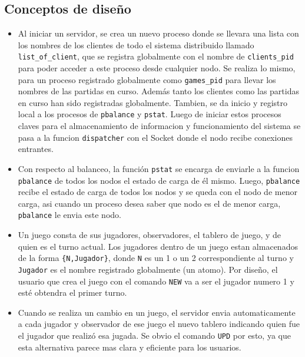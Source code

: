 \documentclass[a4paper]{article}
\newcommand{\blacktr}[0]{\item[$\blacktriangleright$]}
\begin{document}
\subsection*{Conceptos de diseño}
\begin{itemize}
  \blacktr Al iniciar un servidor, se crea un nuevo proceso donde se llevara una lista con los nombres de los clientes de todo el sistema distribuido llamado \texttt{list_of_client}, que se registra globalmente con el nombre de \texttt{clients_pid} para poder acceder a este proceso desde cualquier nodo. Se realiza lo mismo, para un proceso registrado globalmente como \texttt{games_pid} para llevar los nombres de las partidas en curso. Además tanto los clientes como las partidas en curso han sido registradas globalmente. Tambien, se da inicio y registro local a los procesos de \texttt{pbalance} y \texttt{pstat}. Luego de iniciar estos procesos claves para el almacenamiento de informacion y funcionamiento del sistema se pasa a la funcion \texttt{dispatcher} con el Socket donde el nodo recibe conexiones entrantes.
  \blacktr Con respecto al balanceo, la función \texttt{pstat} se encarga de enviarle a la funcion \texttt{pbalance} de todos los nodos el estado de carga de él mismo. Luego, \texttt{pbalance} recibe el estado de carga de todos los nodos y se queda con el nodo de menor carga, asi cuando un proceso desea saber que nodo es el de menor carga, \texttt{pbalance} le envia este nodo.
  \blacktr Un juego consta de sus jugadores, observadores, el tablero de juego, y de quien es el turno actual. Los jugadores dentro de un juego estan almacenados de la forma \texttt{\{N,Jugador\}}, donde \texttt{N} es un 1 o un 2 correspondiente al turno y \texttt{Jugador} es el nombre registrado globalmente (un atomo). Por diseño, el usuario que crea el juego con el comando \texttt{NEW} va a ser el jugador numero 1 y esté obtendra el primer turno.
  \blacktr Cuando se realiza un cambio en un juego, el servidor envia automaticamente a cada jugador y observador de ese juego el nuevo tablero indicando quien fue el jugador que realizó esa jugada. Se obvio el comando \texttt{UPD} por esto, ya que esta alternativa parece mas clara y eficiente para los usuarios. 
\end{itemize}
\end{document}
